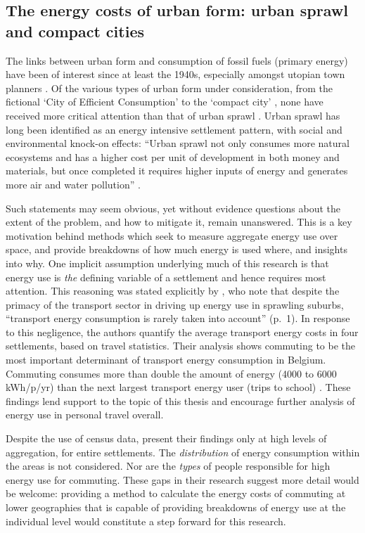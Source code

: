 \subsection{The energy costs of urban form: urban sprawl and compact cities}
The links between urban form and consumption of fossil fuels (primary energy)
have been of interest since at least the 1940s, especially amongst utopian town
planners \citep{Steadman1977}. Of the various types of urban form under
consideration, from the fictional `City of Efficient Consumption'
\citep{Goodman1947} to the `compact city' \citep{Breheny1995}, none have
received more critical attention than that of urban sprawl \citep{Marshall2008}.
Urban sprawl has long been identified as an energy intensive settlement
pattern, with social and environmental knock-on effects: ``Urban sprawl not only
consumes more natural ecosystems and has a higher cost per unit of development
in both money and materials, but once completed it requires higher inputs of
energy and generates more air and water pollution'' \citep{Bormann1976}.

Such statements may seem obvious, yet without evidence questions about
the extent of the
problem, and how to mitigate it, remain unanswered. This is a key motivation
behind methods which seek to measure aggregate energy use over space, and
provide breakdowns of how much energy is used where, and insights into why.
One implicit assumption underlying much of this research is that
energy use is \emph{the} defining
variable of a settlement and hence requires most attention.
This reasoning was stated explicitly by
\citet{Marique2012}, who note that despite the primacy of the transport sector
in driving up energy use in sprawling suburbs, ``transport energy consumption
is rarely taken into account'' (p.~1). In response to this negligence, the authors
quantify the average transport energy costs in four settlements, based on travel
statistics. Their analysis shows commuting to be the most
important determinant of transport energy consumption in Belgium. Commuting
consumes more than double the amount of energy (4000 to 6000 kWh/p/yr) 
than the next largest transport energy user (trips to school)
\citep{Marique2012}. These findings lend support to the topic of this thesis and
encourage further analysis of energy use in personal travel overall.

Despite the use of census data, \citet{Marique2012} present their findings only
at high levels of aggregation, for entire settlements. The \emph{distribution}
of energy consumption within the areas is not considered. Nor are the
\emph{types} of people responsible for high energy use for commuting. These
gaps in their research suggest more detail would be welcome: providing a method
to calculate the energy costs of commuting at lower geographies that is capable
of providing breakdowns of energy use at the individual level would constitute
a step forward for this research.

